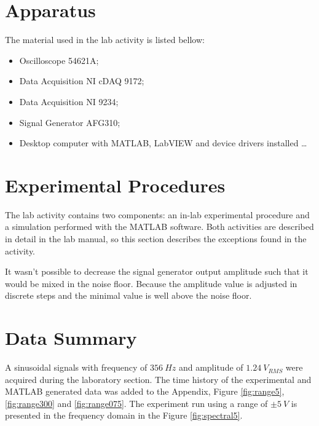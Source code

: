 \documentclass[10pt,letterpaper,twocolumn]{article}
\begin{document}
\section{Apparatus}
    The material used in the lab activity is listed bellow:
    

    \begin{itemize}
      \item Oscilloscope 54621A;
      \item Data Acquisition NI cDAQ 9172;
      \item Data Acquisition NI 9234;
      \item Signal Generator AFG310;
      \item Desktop computer with MATLAB, LabVIEW and device drivers installed \ldots
    \end{itemize}


\section{Experimental Procedures}
    The lab activity contains two components: an in-lab experimental procedure and a simulation performed with the MATLAB software. Both activities are described in detail in the lab manual, so this section describes the exceptions found in the activity.
    
    It wasn't possible to decrease the signal generator output amplitude such that it would be mixed in the noise floor. Because the amplitude value is adjusted in discrete steps and the minimal value is well above the noise floor.


\section{Data Summary}
    A sinusoidal signals with frequency of $356\ Hz$ and amplitude of $1.24\ V_{RMS}$ were acquired during the laboratory section. The time history of the experimental and MATLAB generated data was added to the Appendix, Figure \ref{fig:range5}, \ref{fig:range300} and \ref{fig:range075}. The experiment run using a range of $\pm 5\ V$ is presented in the frequency domain in the Figure \ref{fig:spectral5}.
    
\end{document}
